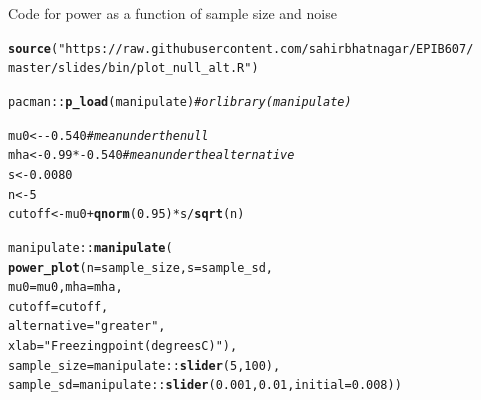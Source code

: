 \documentclass[10pt,handout]{beamer}\usepackage[]{graphicx}\usepackage[]{color}
\makeatletter
\newcommand{\hlnum}[1]{\textcolor[rgb]{0.686,0.059,0.569}{#1}}%
\newcommand{\hlstr}[1]{\textcolor[rgb]{0.192,0.494,0.8}{#1}}%
\newcommand{\hlcom}[1]{\textcolor[rgb]{0.678,0.584,0.686}{\textit{#1}}}%
\newcommand{\hlopt}[1]{\textcolor[rgb]{0,0,0}{#1}}%
\newcommand{\hlstd}[1]{\textcolor[rgb]{0.345,0.345,0.345}{#1}}%
\newcommand{\hlkwb}[1]{\textcolor[rgb]{0.69,0.353,0.396}{#1}}%
\newcommand{\hlkwc}[1]{\textcolor[rgb]{0.333,0.667,0.333}{#1}}%
\newcommand{\hlkwd}[1]{\textcolor[rgb]{0.737,0.353,0.396}{\textbf{#1}}}%
\newenvironment{kframe}{%
 \def\at@end@of@kframe{}%
 \ifinner\ifhmode%
  \def\at@end@of@kframe{\end{minipage}}%
  \begin{minipage}{\columnwidth}%
 \fi\fi%
 \def\FrameCommand##1{\hskip\@totalleftmargin \hskip-\fboxsep
 \colorbox{shadecolor}{##1}\hskip-\fboxsep
     \hskip-\linewidth \hskip-\@totalleftmargin \hskip\columnwidth}%
 \MakeFramed {\advance\hsize-\width
   \@totalleftmargin\z@ \linewidth\hsize
   \@setminipage}}%
 {\par\unskip\endMakeFramed%
 \at@end@of@kframe}
\newenvironment{knitrout}{}{} %
\makeatother
\begin{document}
\begin{frame}[fragile]{Code for power as a function of sample size and noise}
\begin{knitrout}\tiny
{}\color{fgcolor}\begin{kframe}
\begin{alltt}
\hlkwd{source}\hlstd{(}\hlstr{"https://raw.githubusercontent.com/sahirbhatnagar/EPIB607/
        master/slides/bin/plot_null_alt.R"}\hlstd{)}

\hlstd{pacman}\hlopt{::}\hlkwd{p_load}\hlstd{(manipulate)} \hlcom{# or library(manipulate)}

\hlstd{mu0} \hlkwb{<-} \hlopt{-}\hlnum{0.540} \hlcom{# mean under the null}
\hlstd{mha} \hlkwb{<-} \hlnum{0.99}\hlopt{*-}\hlnum{0.540} \hlcom{# mean under the alternative}
\hlstd{s} \hlkwb{<-} \hlnum{0.0080}
\hlstd{n} \hlkwb{<-} \hlnum{5}
\hlstd{cutoff} \hlkwb{<-} \hlstd{mu0} \hlopt{+} \hlkwd{qnorm}\hlstd{(}\hlnum{0.95}\hlstd{)} \hlopt{*} \hlstd{s} \hlopt{/} \hlkwd{sqrt}\hlstd{(n)}

\hlstd{manipulate}\hlopt{::}\hlkwd{manipulate}\hlstd{(}
\hlkwd{power_plot}\hlstd{(}\hlkwc{n} \hlstd{= sample_size,} \hlkwc{s} \hlstd{= sample_sd,}
\hlkwc{mu0} \hlstd{= mu0,} \hlkwc{mha} \hlstd{= mha,}
\hlkwc{cutoff} \hlstd{= cutoff,}
\hlkwc{alternative} \hlstd{=} \hlstr{"greater"}\hlstd{,}
\hlkwc{xlab} \hlstd{=} \hlstr{"Freezing point (degrees C)"}\hlstd{),}
\hlkwc{sample_size} \hlstd{= manipulate}\hlopt{::}\hlkwd{slider}\hlstd{(}\hlnum{5}\hlstd{,} \hlnum{100}\hlstd{),}
\hlkwc{sample_sd} \hlstd{= manipulate}\hlopt{::}\hlkwd{slider}\hlstd{(}\hlnum{0.001}\hlstd{,} \hlnum{0.01}\hlstd{,} \hlkwc{initial} \hlstd{=} \hlnum{0.008}\hlstd{))}
\end{alltt}
\end{kframe}
\end{knitrout}
\end{frame}
\end{document}
